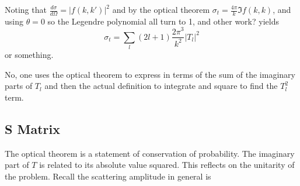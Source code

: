 \documentclass[fontsize=12pt]{scrartcl}
\begin{document}
Noting that $\frac{d\sigma}{d\Omega} = |f(k,k')|^2$ and by the optical theorem $\sigma_t = \frac{4\pi}{k} \Im f(k,k)$, and using $\theta=0$ so the Legendre polynomial all turn to 1, and other work? yields $$\sigma_t = \sum_l (2l+1) \frac{2\pi^3}{k^2}|T_l|^2$$ or something. 

No, one uses the optical theorem to express in terms of the sum of the imaginary parts of $T_l$ and then the actual definition to integrate and square to find the $T_l^2$ term.

\subsection{S Matrix}

The optical theorem is a statement of conservation of probability. The imaginary part of $T$ is related to its absolute value squared. This reflects on the unitarity of the problem. Recall the scattering amplitude in general is $$
\end{document}
